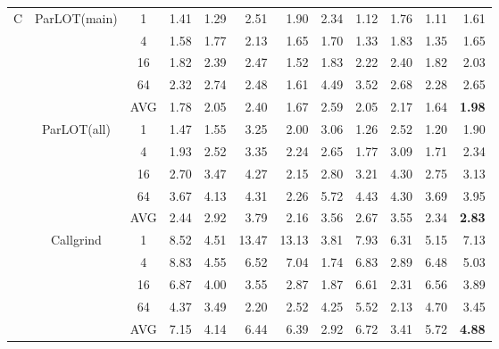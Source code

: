 \begin{table*}[]
\begin{center}
\begin{tabular}{|c|c|c|rrrrrrrr|r|}
\multirow{15}{*}{C} & \multirow{5}{*}{ParLOT(main)} & 1 & 1.41 & 1.29 & 2.51 & 1.90 & 2.34 & 1.12 & 1.76 & 1.11 & 1.61 \\
 &  & 4 & 1.58 & 1.77 & 2.13 & 1.65 & 1.70 & 1.33 & 1.83 & 1.35 & 1.65 \\
 &  & 16 & 1.82 & 2.39 & 2.47 & 1.52 & 1.83 & 2.22 & 2.40 & 1.82 & 2.03 \\
 &  & 64 & 2.32 & 2.74 & 2.48 & 1.61 & 4.49 & 3.52 & 2.68 & 2.28 & 2.65 \\ \cline{3-12} 
 &  & AVG & 1.78 & 2.05 & 2.40 & 1.67 & 2.59 & 2.05 & 2.17 & 1.64 & \textbf{1.98} \\ \cline{2-12} 
 & \multirow{5}{*}{ParLOT(all)} & 1 & 1.47 & 1.55 & 3.25 & 2.00 & 3.06 & 1.26 & 2.52 & 1.20 & 1.90 \\
 &  & 4 & 1.93 & 2.52 & 3.35 & 2.24 & 2.65 & 1.77 & 3.09 & 1.71 & 2.34 \\
 &  & 16 & 2.70 & 3.47 & 4.27 & 2.15 & 2.80 & 3.21 & 4.30 & 2.75 & 3.13 \\
 &  & 64 & 3.67 & 4.13 & 4.31 & 2.26 & 5.72 & 4.43 & 4.30 & 3.69 & 3.95 \\ \cline{3-12} 
 &  & AVG & 2.44 & 2.92 & 3.79 & 2.16 & 3.56 & 2.67 & 3.55 & 2.34 & \textbf{2.83} \\ \cline{2-12} 
 & \multirow{5}{*}{Callgrind} & 1 & 8.52 & 4.51 & 13.47 & 13.13 & 3.81 & 7.93 & 6.31 & 5.15 & 7.13 \\
 &  & 4 & 8.83 & 4.55 & 6.52 & 7.04 & 1.74 & 6.83 & 2.89 & 6.48 & 5.03 \\
 &  & 16 & 6.87 & 4.00 & 3.55 & 2.87 & 1.87 & 6.61 & 2.31 & 6.56 & 3.89 \\
 &  & 64 & 4.37 & 3.49 & 2.20 & 2.52 & 4.25 & 5.52 & 2.13 & 4.70 & 3.45 \\ \cline{3-12} 
 &  & AVG & 7.15 & 4.14 & 6.44 & 6.39 & 2.92 & 6.72 & 3.41 & 5.72 & \textbf{4.88} \\ \hline
\end{tabular}
\end{center}
\end{table*}

\fi